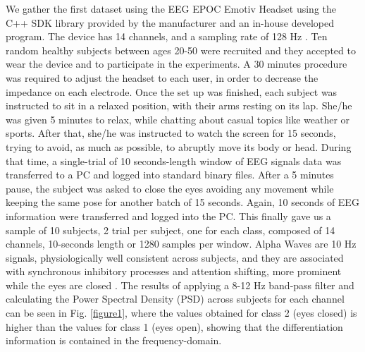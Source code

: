 \documentclass[nouppercase]{ifmbe}
\begin{document}

We gather the first dataset using the EEG EPOC Emotiv Headset using the C++ SDK library provided by the manufacturer and an in-house developed program. The device has 14 channels, and a sampling rate of 128 Hz \cite{c11}. Ten random healthy subjects between ages 20-50 were recruited and they accepted to wear the device and to participate in the experiments.  A 30 minutes procedure was required to adjust the headset to each user, in order to decrease the impedance on each electrode. Once the set up was finished, each subject was instructed to sit in a relaxed position, with their arms resting on its lap.  She/he was given 5 minutes to relax, while chatting about casual topics like weather or sports.  After that, she/he was instructed to watch the screen for 15 seconds, trying to avoid, as much as possible, to abruptly move its body or head.  During that time, a single-trial of 10 seconds-length window of EEG signals data was transferred to a PC and logged into standard binary files. After a 5 minutes pause, the subject was asked to close the eyes avoiding any movement while keeping the same pose for another batch of 15 seconds.  Again, 10 seconds of EEG information were transferred and logged into the PC. This finally gave us a sample of 10 subjects,  2 trial per subject, one for each class, composed of 14 channels, 10-seconds length or 1280 samples per window. Alpha Waves are 10 Hz signals, physiologically well consistent across subjects, and they are associated with synchronous inhibitory processes and attention shifting, more prominent while the eyes are closed \cite{c3}. The results of applying a 8-12 Hz band-pass filter and calculating the Power Spectral Density (PSD) across subjects for each channel can be seen in Fig. \ref{figure1}, where the values obtained for class 2 (eyes closed) is higher than the values for class 1 (eyes open), showing that the differentiation information is contained in the frequency-domain.
 
\end{document}

